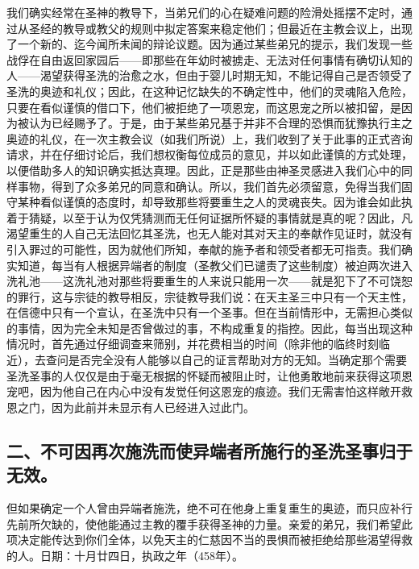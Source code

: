 我们确实经常在圣神的教导下，当弟兄们的心在疑难问题的险滑处摇摆不定时，通过从圣经的教导或教父的规则中拟定答案来稳定他们；但最近在主教会议上，出现了一个新的、迄今闻所未闻的辩论议题。因为通过某些弟兄的提示，我们发现一些战俘在自由返回家园后——即那些在年幼时被掳走、无法对任何事情有确切认知的人——渴望获得圣洗的治愈之水，但由于婴儿时期无知，不能记得自己是否领受了圣洗的奥迹和礼仪；因此，在这种记忆缺失的不确定性中，他们的灵魂陷入危险，只要在看似谨慎的借口下，他们被拒绝了一项恩宠，而这恩宠之所以被扣留，是因为被认为已经赐予了。于是，由于某些弟兄基于并非不合理的恐惧而犹豫执行主之奥迹的礼仪，在一次主教会议（如我们所说）上，我们收到了关于此事的正式咨询请求，并在仔细讨论后，我们想权衡每位成员的意见，并以如此谨慎的方式处理，以便借助多人的知识确实抵达真理。因此，正是那些由神圣灵感进入我们心中的同样事物，得到了众多弟兄的同意和确认。所以，我们首先必须留意，免得当我们固守某种看似谨慎的态度时，却导致那些将要重生之人的灵魂丧失。因为谁会如此执着于猜疑，以至于认为仅凭猜测而无任何证据所怀疑的事情就是真的呢？因此，凡渴望重生的人自己无法回忆其圣洗，也无人能对其对天主的奉献作见证时，就没有引入罪过的可能性，因为就他们所知，奉献的施予者和领受者都无可指责。我们确实知道，每当有人根据异端者的制度（圣教父们已谴责了这些制度）被迫两次进入洗礼池——这洗礼池对那些将要重生的人来说只能用一次——就是犯下了不可饶恕的罪行，这与宗徒的教导相反，宗徒教导我们说：在天主圣三中只有一个天主性，在信德中只有一个宣认，在圣洗中只有一个圣事。但在当前情形中，无需担心类似的事情，因为完全未知是否曾做过的事，不构成重复的指控。因此，每当出现这种情况时，首先通过仔细调查来筛别，并花费相当的时间（除非他的临终时刻临近），去查问是否完全没有人能够以自己的证言帮助对方的无知。当确定那个需要圣洗圣事的人仅仅是由于毫无根据的怀疑而被阻止时，让他勇敢地前来获得这项恩宠吧，因为他自己在内心中没有发觉任何这恩宠的痕迹。我们无需害怕这样敞开救恩之门，因为此前并未显示有人已经进入过此门。\par


\subsection{二、不可因再次施洗而使异端者所施行的圣洗圣事归于无效。}

但如果确定一个人曾由异端者施洗，绝不可在他身上重复重生的奥迹，而只应补行先前所欠缺的，使他能通过主教的覆手获得圣神的力量。亲爱的弟兄，我们希望此项决定能传达到你们全体，以免天主的仁慈因不当的畏惧而被拒绝给那些渴望得救的人。日期：十月廿四日，执政之年（458年）。\par

